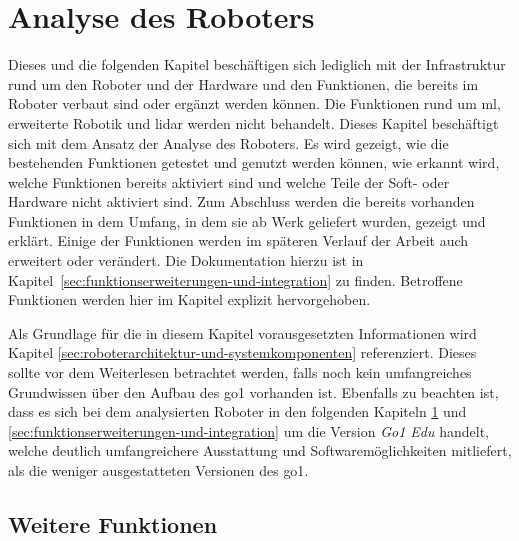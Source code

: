 \section{Analyse des Roboters}
\label{sec:analyse-des-roboters}

Dieses und die folgenden Kapitel beschäftigen sich lediglich mit der Infrastruktur rund um den Roboter
und der Hardware und den Funktionen, die bereits im Roboter verbaut sind oder ergänzt werden können.
Die Funktionen rund um \gls{ml}, erweiterte Robotik und \gls{lidar} werden nicht behandelt.
Dieses Kapitel beschäftigt sich mit dem Ansatz der Analyse des Roboters.
Es wird gezeigt, wie die bestehenden Funktionen getestet und genutzt werden können, wie erkannt wird,
welche Funktionen bereits aktiviert sind und welche Teile der Soft- oder Hardware nicht aktiviert sind.
Zum Abschluss werden die bereits vorhanden Funktionen in dem Umfang, in dem sie ab Werk geliefert wurden,
gezeigt und erklärt.
Einige der Funktionen werden im späteren Verlauf der Arbeit auch erweitert oder verändert.
Die Dokumentation hierzu ist in Kapitel~\ref{sec:funktionserweiterungen-und-integration} zu finden.
Betroffene Funktionen werden hier im Kapitel explizit hervorgehoben.

Als Grundlage für die in diesem Kapitel vorausgesetzten Informationen wird Kapitel \ref{sec:roboterarchitektur-und-systemkomponenten}
referenziert.
Dieses sollte vor dem Weiterlesen betrachtet werden, falls noch kein umfangreiches Grundwissen über den Aufbau des \gls{go1}
vorhanden ist.
Ebenfalls zu beachten ist, dass es sich bei dem analysierten Roboter in den folgenden Kapiteln \ref{sec:analyse-des-roboters}
und \ref{sec:funktionserweiterungen-und-integration} um die Version \emph{Go1 Edu} handelt, welche deutlich umfangreichere
Ausstattung und Softwaremöglichkeiten mitliefert, als die weniger ausgestatteten Versionen des \gls{go1}.












\subsection{Weitere Funktionen}
\label{subsec:weitere-funktionen}


